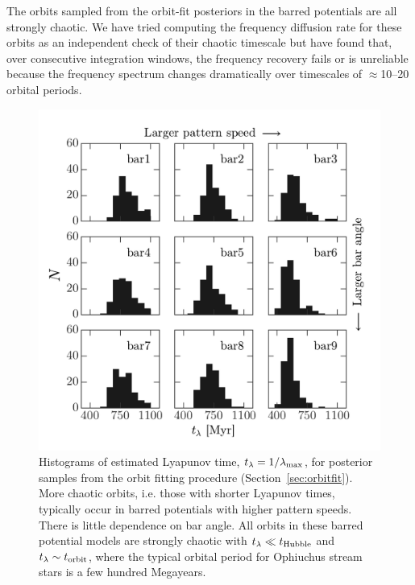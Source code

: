 The orbits sampled from the orbit-fit posteriors in the barred potentials are
all strongly chaotic. We have tried computing the frequency diffusion rate for
these orbits as an independent check of their chaotic timescale but have found
that, over consecutive integration windows, the frequency recovery fails or is
unreliable because the frequency spectrum changes dramatically over timescales
of $\approx$10--20 orbital periods.

\begin{figure}[!th]
\begin{center}
\includegraphics[width=\textwidth]{figures/ch4/lyapunov-hist}
\caption{ Histograms of estimated Lyapunov time, $t_\lambda=1/\lambda_{\rm max}$, for
posterior samples from the orbit fitting procedure (Section~\ref{sec:orbitfit}).
More chaotic orbits, i.e. those with shorter Lyapunov times, typically occur in
barred potentials with higher pattern speeds. There is little dependence on bar
angle. All orbits in these barred potential models are strongly chaotic with
$t_\lambda \ll t_{\rm Hubble}$ and $t_\lambda \sim t_{\rm orbit}$, where the
typical orbital period for Ophiuchus stream stars is a few hundred Megayears.}
\label{fig:lyapunov-hist}
\end{center}
\end{figure}

